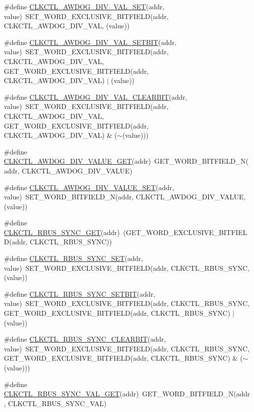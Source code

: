 \begin{DoxyCompactItemize}
\item 
\#define \hyperlink{a00544_a556a71ae53bd8e41bb3128a55e95f59d}{CLKCTL\_\-AWDOG\_\-DIV\_\-VAL\_\-SET}(addr, value)~SET\_\-WORD\_\-EXCLUSIVE\_\-BITFIELD(addr, CLKCTL\_\-AWDOG\_\-DIV\_\-VAL, (value))
\item 
\#define \hyperlink{a00544_a6979f09bbe658453a223b764aa4c9e34}{CLKCTL\_\-AWDOG\_\-DIV\_\-VAL\_\-SETBIT}(addr, value)~SET\_\-WORD\_\-EXCLUSIVE\_\-BITFIELD(addr, CLKCTL\_\-AWDOG\_\-DIV\_\-VAL, GET\_\-WORD\_\-EXCLUSIVE\_\-BITFIELD(addr, CLKCTL\_\-AWDOG\_\-DIV\_\-VAL) $|$ (value))
\item 
\#define \hyperlink{a00544_af88b13f244c74a084b7376e6c44af331}{CLKCTL\_\-AWDOG\_\-DIV\_\-VAL\_\-CLEARBIT}(addr, value)~SET\_\-WORD\_\-EXCLUSIVE\_\-BITFIELD(addr, CLKCTL\_\-AWDOG\_\-DIV\_\-VAL, GET\_\-WORD\_\-EXCLUSIVE\_\-BITFIELD(addr, CLKCTL\_\-AWDOG\_\-DIV\_\-VAL) \& ($\sim$(value)))
\item 
\#define \hyperlink{a00544_a6c7d732df753fdaea82e4700728793cd}{CLKCTL\_\-AWDOG\_\-DIV\_\-VALUE\_\-GET}(addr)~GET\_\-WORD\_\-BITFIELD\_\-N(addr, CLKCTL\_\-AWDOG\_\-DIV\_\-VALUE)
\item 
\#define \hyperlink{a00544_a4c6e3500aedebfb7edc4570e43f228c8}{CLKCTL\_\-AWDOG\_\-DIV\_\-VALUE\_\-SET}(addr, value)~SET\_\-WORD\_\-BITFIELD\_\-N(addr, CLKCTL\_\-AWDOG\_\-DIV\_\-VALUE, (value))
\item 
\#define \hyperlink{a00544_a619b6f79a8071cdf7dc186bca2b1b9f6}{CLKCTL\_\-RBUS\_\-SYNC\_\-GET}(addr)~(GET\_\-WORD\_\-EXCLUSIVE\_\-BITFIELD(addr, CLKCTL\_\-RBUS\_\-SYNC))
\item 
\#define \hyperlink{a00544_a3c5feb05b980b8e8f091f1a3da55b3e1}{CLKCTL\_\-RBUS\_\-SYNC\_\-SET}(addr, value)~SET\_\-WORD\_\-EXCLUSIVE\_\-BITFIELD(addr, CLKCTL\_\-RBUS\_\-SYNC, (value))
\item 
\#define \hyperlink{a00544_a1284068944111603e75cde82e0a90a9f}{CLKCTL\_\-RBUS\_\-SYNC\_\-SETBIT}(addr, value)~SET\_\-WORD\_\-EXCLUSIVE\_\-BITFIELD(addr, CLKCTL\_\-RBUS\_\-SYNC, GET\_\-WORD\_\-EXCLUSIVE\_\-BITFIELD(addr, CLKCTL\_\-RBUS\_\-SYNC) $|$ (value))
\item 
\#define \hyperlink{a00544_a6368eb2e3cc21e0d58d50e1b952b6e19}{CLKCTL\_\-RBUS\_\-SYNC\_\-CLEARBIT}(addr, value)~SET\_\-WORD\_\-EXCLUSIVE\_\-BITFIELD(addr, CLKCTL\_\-RBUS\_\-SYNC, GET\_\-WORD\_\-EXCLUSIVE\_\-BITFIELD(addr, CLKCTL\_\-RBUS\_\-SYNC) \& ($\sim$(value)))
\item 
\#define \hyperlink{a00544_ad126ec71cb513f6a898c3dea67583cfe}{CLKCTL\_\-RBUS\_\-SYNC\_\-VAL\_\-GET}(addr)~GET\_\-WORD\_\-BITFIELD\_\-N(addr, CLKCTL\_\-RBUS\_\-SYNC\_\-VAL)

\end{DoxyCompactItemize}
